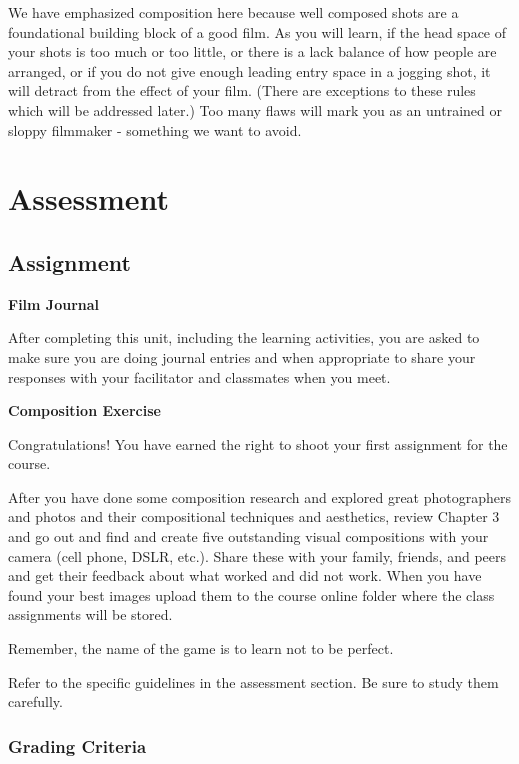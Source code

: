 \documentclass[
]{book}
\begin{document}
We have emphasized composition here because well composed shots are a foundational building block of a good film. As you will learn, if the head space of your shots is too much or too little, or there is a lack balance of how people are arranged, or if you do not give enough leading entry space in a jogging shot, it will detract from the effect of your film. (There are exceptions to these rules which will be addressed later.) Too many flaws will mark you as an untrained or sloppy filmmaker - something we want to avoid.

\hypertarget{assessment-2}{%
\section*{Assessment}\label{assessment-2}}

\hypertarget{assignment}{%
\subsection*{Assignment}\label{assignment}}

\textbf{Film Journal}

After completing this unit, including the learning activities, you are asked to make sure you are doing journal entries and when appropriate to share your responses with your facilitator and classmates when you meet.

\textbf{Composition Exercise}

Congratulations! You have earned the right to shoot your first assignment for the course.

After you have done some composition research and explored great photographers and photos and their compositional techniques and aesthetics, review Chapter 3 and go out and find and create five outstanding visual compositions with your camera (cell phone, DSLR, etc.). Share these with your family, friends, and peers and get their feedback about what worked and did not work. When you have found your best images upload them to the course online folder where the class assignments will be stored.

Remember, the name of the game is to learn not to be perfect.

Refer to the specific guidelines in the assessment section. Be sure to study them carefully.

\hypertarget{grading-criteria-2}{%
\subsubsection*{Grading Criteria}\label{grading-criteria-2}}
\end{document}
